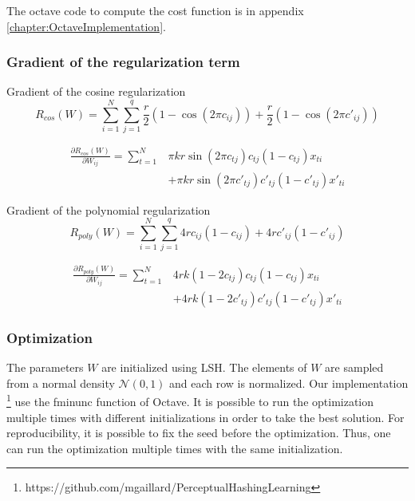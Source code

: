 The octave code to compute the cost function is in appendix \ref{chapter:OctaveImplementation}. 

\subsubsection{Gradient of the regularization term}
Gradient of the cosine regularization
\[
	R_{cos}(W) = \sum\limits_{i=1}^N \sum\limits_{j=1}^q \frac{r}{2}(1 - \cos(2 \pi c_{ij})) + \frac{r}{2}(1 - \cos(2 \pi c'_{ij}))
\]

\[
\begin{split}
	\frac{\partial R_{cos}(W)}{\partial W_{ij}} = \sum\limits_{t=1}^N &   \pi kr \sin(2 \pi c_{tj}) c_{tj} (1 - c_{tj}) x_{ti} \\
	                                                                  & + \pi kr \sin(2 \pi c'_{tj}) c'_{tj} (1 - c'_{tj}) x'_{ti}
\end{split}
\]

Gradient of the polynomial regularization
\[
	R_{poly}(W) = \sum\limits_{i=1}^N \sum\limits_{j=1}^q 4r c_{ij}(1 - c_{ij}) + 4r c'_{ij}(1 - c'_{ij})
\]

\[
\begin{split}
	\frac{\partial R_{poly}(W)}{\partial W_{ij}} = \sum\limits_{t=1}^N &   4rk (1-2c_{tj}) c_{tj} (1 - c_{tj}) x_{ti}    \\
	                                                                   & + 4rk (1-2c'_{tj}) c'_{tj} (1 - c'_{tj}) x'_{ti}
\end{split}
\]

\subsubsection{Optimization}
The parameters $W$ are initialized using LSH. The elements of $W$ are sampled from a normal density $\mathcal{N}(0, 1)$ and each row is normalized. Our implementation \footnote{https://github.com/mgaillard/PerceptualHashingLearning} use the fminunc function of Octave. It is possible to run the optimization multiple times with different initializations in order to take the best solution. For reproducibility, it is possible to fix the seed before the optimization. Thus, one can run the optimization multiple times with the same initialization.

